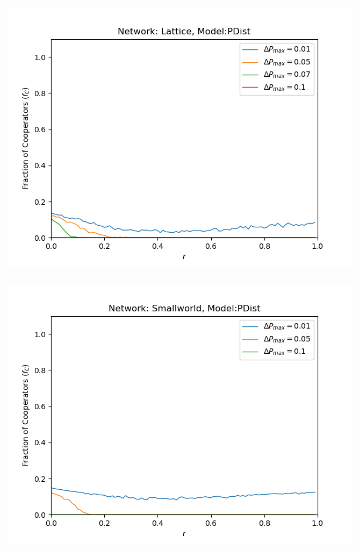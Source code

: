 \documentclass[11pt, A4 paper, twocolumn ]{article}
\begin{document}
		\begin{figure}[p]
		\centering
		\vspace{-0.9cm}
		\begin{subfigure}[b]{0.3\textwidth}
			\centering
			\includegraphics[width=\textwidth]{graphs/lat-pdist}
			\caption{}
			\label{fig:lat-pdist}
		\end{subfigure}
		\begin{subfigure}[b]{0.3\textwidth}
			\centering
			\includegraphics[width=\textwidth]{graphs/sw-pdist}
			\caption{}
			\label{fig:sw-pdist}
		\end{subfigure}
		\begin{subfigure}[b]{0.3\textwidth}
			\centering

\end{subfigure}
\end{figure}
\end{document}
